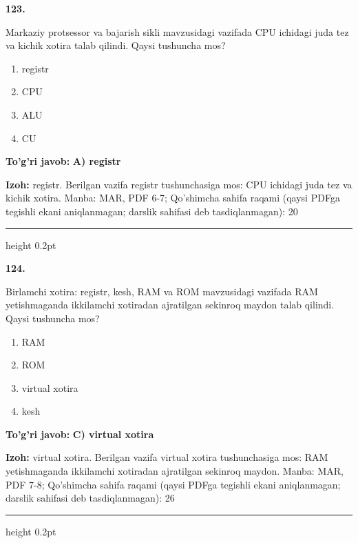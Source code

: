 \documentclass[10pt,a4paper]{article}
\begin{document}
{\bfseries\sffamily\color{ink} 123.}
\par
Markaziy protsessor va bajarish sikli mavzusidagi vazifada CPU ichidagi juda tez va kichik xotira talab qilindi. Qaysi tushuncha mos?
\begin{enumerate}[label=\Alph*),leftmargin=9mm]
\item registr
\item CPU
\item ALU
\item CU
\end{enumerate}
\begin{tcolorbox}[enhanced,breakable,colback=teal!4,colframe=teal!60!black,boxrule=0.45pt,arc=1.2mm,left=2.7mm,right=2.7mm,top=1.8mm,bottom=1.8mm,before skip=2mm,after skip=2mm]
{\bfseries\sffamily\color{teal}To'g'ri javob:} \textbf{A) registr}
\par\smallskip
{\bfseries Izoh:} registr. Berilgan vazifa registr tushunchasiga mos: CPU ichidagi juda tez va kichik xotira. Manba: MAR, PDF 6-7; Qo'shimcha sahifa raqami (qaysi PDFga tegishli ekani aniqlanmagan; darslik sahifasi deb tasdiqlanmagan): 20
\end{tcolorbox}
\vspace{2mm}\hrule height 0.2pt\vspace{3mm}

{\bfseries\sffamily\color{ink} 124.}
\par
Birlamchi xotira: registr, kesh, RAM va ROM mavzusidagi vazifada RAM yetishmaganda ikkilamchi xotiradan ajratilgan sekinroq maydon talab qilindi. Qaysi tushuncha mos?
\begin{enumerate}[label=\Alph*),leftmargin=9mm]
\item RAM
\item ROM
\item virtual xotira
\item kesh
\end{enumerate}
\begin{tcolorbox}[enhanced,breakable,colback=teal!4,colframe=teal!60!black,boxrule=0.45pt,arc=1.2mm,left=2.7mm,right=2.7mm,top=1.8mm,bottom=1.8mm,before skip=2mm,after skip=2mm]
{\bfseries\sffamily\color{teal}To'g'ri javob:} \textbf{C) virtual xotira}
\par\smallskip
{\bfseries Izoh:} virtual xotira. Berilgan vazifa virtual xotira tushunchasiga mos: RAM yetishmaganda ikkilamchi xotiradan ajratilgan sekinroq maydon. Manba: MAR, PDF 7-8; Qo'shimcha sahifa raqami (qaysi PDFga tegishli ekani aniqlanmagan; darslik sahifasi deb tasdiqlanmagan): 26
\end{tcolorbox}
\vspace{2mm}\hrule height 0.2pt\vspace{3mm}
\end{document}
